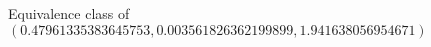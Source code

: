 \documentclass[preview]{standalone}
\begin{document}
\begin{center}
Equivalence class of $(0.47961335383645753, 0.003561826362199899, 1.941638056954671)$
\end{center}
\end{document}
